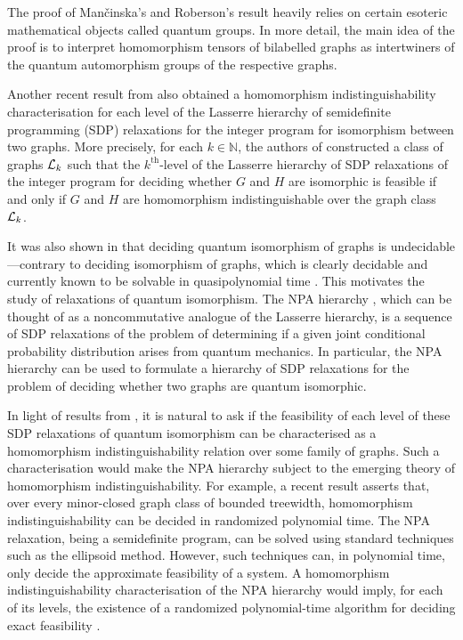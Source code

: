\documentclass[a4paper,onecolumn,11pt,accepted=2026-01-06]{quantumarticle}
\theoremstyle{plain}
\theoremstyle{remark}
\theoremstyle{definition}
\begin{document}
The proof of Man\v{c}inska's and Roberson's result \cite{david-laura} heavily relies on certain esoteric mathematical objects called quantum groups. 
In more detail, the main idea of the proof is to interpret homomorphism tensors of bilabelled graphs as intertwiners of the quantum automorphism groups of the respective graphs. 

Another recent result from \cite{roberson-seppelt-arxiv} also obtained a homomorphism indistinguishability characterisation for each level of the Lasserre hierarchy of semidefinite programming (SDP) relaxations for the integer program for isomorphism between two graphs. 
More precisely, for each $k \in \mathbb{N}$, the authors of \cite{roberson-seppelt-arxiv} constructed a class of graphs ${\mathcal L}_k$ such that the $k^{\text{th}}$-level of the Lasserre hierarchy of SDP relaxations of the integer program for deciding whether $G$ and $H$ are isomorphic is feasible if and only if $G$ and $H$ are homomorphism indistinguishable over the graph class ${\mathcal L}_k$. 

It was also shown in \cite{ATSERIAS2019289} that deciding quantum isomorphism of graphs is undecidable---contrary to deciding isomorphism of graphs, which is clearly decidable and currently known to be solvable in quasipolynomial time \cite{babai_graph_2016}. 
This motivates the study of relaxations of quantum isomorphism. 
The NPA hierarchy \cite{Navascues_2008}, which can be thought of as a noncommutative analogue of the Lasserre hierarchy, is a sequence of SDP relaxations of the problem of determining if a given joint conditional probability distribution arises from quantum mechanics. In particular, the NPA hierarchy can be used to formulate a hierarchy of SDP relaxations for the problem of deciding whether two graphs are quantum isomorphic. 

In light of results from \cite{david-laura,roberson-seppelt-arxiv}, 
it is natural to ask if the feasibility of each level of these SDP relaxations of quantum isomorphism can be characterised as a homomorphism indistinguishability relation over some family of graphs. 
Such a characterisation would make the NPA hierarchy subject to the emerging theory of homomorphism indistinguishability.
For example, a recent result \cite{seppelt_algorithmic_2024} asserts that, over every minor-closed graph class of bounded treewidth, homomorphism indistinguishability can be decided in randomized polynomial time.
The NPA relaxation, being a semidefinite program, can be solved using standard techniques such as the ellipsoid method. However, such techniques can, in polynomial time, only decide the approximate feasibility of a system.
A homomorphism indistinguishability characterisation of the NPA hierarchy would imply, for each of its levels, the existence of a randomized polynomial-time algorithm for deciding exact feasibility \cite{neuen_homomorphism-distinguishing_2023,seppelt_logical_2023,seppelt_algorithmic_2024}.
\end{document}
